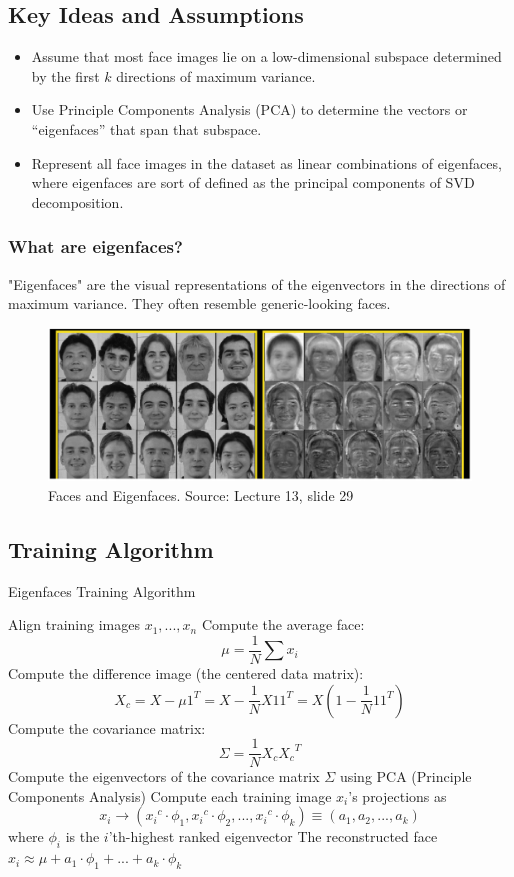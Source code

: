 \documentclass{article}
\begin{document}
\subsection{Key Ideas and Assumptions}
\begin{itemize}
  \item Assume that most face images lie on a low-dimensional subspace determined by the first $k$ directions of maximum variance.
  \item Use Principle Components Analysis (PCA) to determine the vectors or “eigenfaces” that span that subspace.
  \item Represent all face images in the dataset as linear combinations of eigenfaces, where eigenfaces are sort of defined as the principal components of SVD decomposition.
\end{itemize}

\subsubsection{What are eigenfaces?}
"Eigenfaces" are the visual representations of the eigenvectors in the directions of maximum variance. They often resemble generic-looking faces.
\begin{figure}[h]
  \centering
  \includegraphics[width=\textwidth]{generic}
  \caption{Faces and Eigenfaces. Source: Lecture 13, slide 29}
\end{figure}

\subsection{Training Algorithm}
\begin{algorithm}[H]
\caption{Eigenfaces Training Algorithm \cite{eigenfaces}}\label{euclid}
\begin{algorithmic}[1]
\State Align training images $x_1, ..., x_n$
\State Compute the average face: 
$$\mu = \frac{1}{N}\sum x_i$$
\State Compute the difference image (the centered data matrix): 
$$X_c = X - \mu 1^{T} = X - \frac{1}{N}X11^{T} = X(1 - \frac{1}{N}11^{T})$$
\State Compute the covariance matrix:
$$\Sigma = \frac{1}{N}X_{c}{X_{c}}^T$$
\State Compute the eigenvectors of the covariance matrix $\Sigma$ using PCA (Principle Components Analysis)
\State Compute each training image $x_{i}$'s projections as 
$$x_i \rightarrow ({x_{i}}^{c} \cdot \phi_{1}, {x_{i}}^{c} \cdot \phi_{2}, ..., {x_{i}}^{c} \cdot \phi_{k}) \equiv (a_1, a_2, ..., a_k)$$
where $\phi_{i}$ is the $i$'th-highest ranked eigenvector
\State The reconstructed face $x_i \approx \mu + a_1 \cdot \phi_1 + ... + a_k \cdot \phi_k$
\end{algorithmic}
\end{algorithm}
\end{document}
